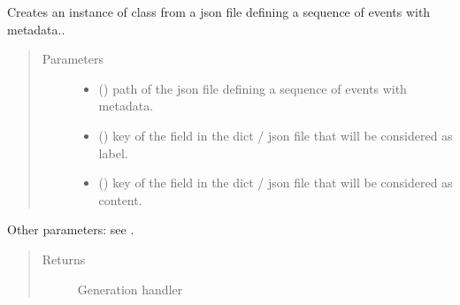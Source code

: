 \documentclass[letterpaper,10pt,english]{sphinxmanual}
\begin{document}
\begin{fulllineitems}
\label{\detokenize{index:GeneratorBuilder.new_generation_handler_from_json_file}}
Creates an instance of class {\hyperref[\detokenize{index:Generator.GenerationHandler}]{}} from a json file defining a sequence of events with metadata..
\begin{quote}\begin{description}
\item[{Parameters}] \leavevmode\begin{itemize}
\item {} 
 () \textendash{} path of the json file defining a sequence of events with metadata.

\item {} 
 () \textendash{} key of the field in the dict / json file that will be considered as label.

\item {} 
 () \textendash{} key of the field in the dict / json file that will be considered as content.

\end{itemize}

\end{description}\end{quote}

Other parameters: see {\hyperref[\detokenize{index:Generator.GenerationHandler}]{}}.
\begin{quote}\begin{description}
\item[{Returns}] \leavevmode
Generation handler


\end{description}
\end{quote}
\end{fulllineitems}
\end{document}
